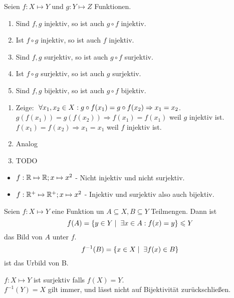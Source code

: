 \documentclass[main.tex]{subfiles}
\begin{document}
\begin{Lemma}
  Seien $f:X\mapsto Y$ und $g: Y \mapsto Z$ Funktionen.
  \begin{enumerate}
    \item Sind $f,g$ injektiv, so ist auch $g \circ f$ injektiv.
    \item Ist $f \circ g$ injektiv, so ist auch $f$ injektiv.
    \item Sind $f,g$ surjektiv, so ist auch $g \circ f$ surjektiv.
    \item Ist $f \circ g$ surjektiv, so ist auch $g$ surjektiv.
    \item Sind $f,g$ bijektiv, so ist auch $g \circ f$ bijektiv.
  \end{enumerate}
\end{Lemma}

\begin{Beweis}
  \begin{enumerate}
    \item Zeige: $\;\forall x_1,x_2 \in X : g \circ f (x_1) = g \circ f (x_2) \Rightarrow x_1 = x_2 $.\\
    $g(f(x_1)) = g(f(x_2)) \Rightarrow f(x_1) = f(x_1)$ weil $g$ injektiv ist.\\
    $f(x_1) = f(x_2) \Rightarrow x_1 = x_1$ weil $f$ injektiv ist.
    \item Analog
    \item TODO
  \end{enumerate}
\end{Beweis}

\begin{Beispiel}
  \begin{itemize}
    \item $f: \mathbb{R} \mapsto \mathbb{R}; x\mapsto x^2$ - Nicht injektiv und nicht surjektiv.
    \item $f: \mathbb{R}^+ \mapsto \mathbb{R}^+; x\mapsto x^2$ - Injektiv und surjektiv also auch bijektiv.
  \end{itemize}
\end{Beispiel}

\begin{Bemerkung}[Notation]
  Seien $f:X\mapsto Y$ eine Funktion un $A\subseteq X,B\subseteq Y$ Teilmengen. Dann ist
  $$f(A) = \{y\in Y \mid \;\exists x\in A : f(x)=y\} \leqslant Y $$
  das Bild von $A$ unter $f$.\\
  $$f^{-1}(B)= \{x\in X \mid \;\exists f(x)\in B\}$$
  ist das Urbild von B.
  \begin{Bemerkung}
    $f:X\mapsto Y$ ist surjektiv falls $f(X)=Y$.\\
    $f^{-1}(Y)=X$ gilt immer, und lässt nicht auf Bijektivität zurückschließen.
  \end{Bemerkung}
\end{Bemerkung}
\end{document}
